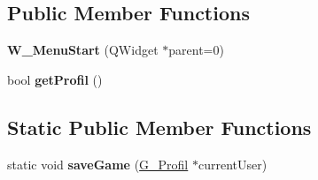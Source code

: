 \subsection*{Public Member Functions}
\begin{DoxyCompactItemize}
\item 
\hypertarget{class_w___menu_start_a7f9c60df0d2a0fba30c37b99d2b7630e}{}{\bfseries W\+\_\+\+Menu\+Start} (Q\+Widget $\ast$parent=0)\label{class_w___menu_start_a7f9c60df0d2a0fba30c37b99d2b7630e}

\item 
\hypertarget{class_w___menu_start_aa147cc302db6aa457fba0c75ab25e1b2}{}bool {\bfseries get\+Profil} ()\label{class_w___menu_start_aa147cc302db6aa457fba0c75ab25e1b2}

\end{DoxyCompactItemize}
\subsection*{Static Public Member Functions}
\begin{DoxyCompactItemize}
\item 
\hypertarget{class_w___menu_start_a87603ac8ad130f946bb152a98acc1a57}{}static void {\bfseries save\+Game} (\hyperlink{class_g___profil}{G\+\_\+\+Profil} $\ast$current\+User)\label{class_w___menu_start_a87603ac8ad130f946bb152a98acc1a57}

\end{DoxyCompactItemize}
